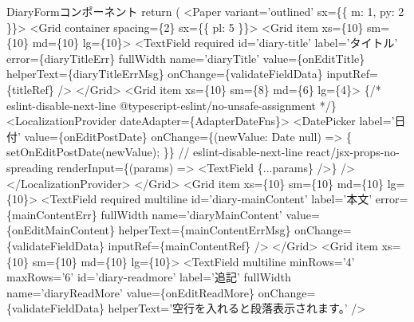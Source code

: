\begin{starterprogram}[]{DiaryFormコンポーネント}
{    return (
      \textless{}Paper variant='outlined' sx=\{\{ m: 1, py: 2 \}\}\textgreater{}
        \textless{}Grid container spacing=\{2\} sx=\{\{ pl: 5 \}\}\textgreater{}
          \textless{}Grid item xs=\{10\} sm=\{10\} md=\{10\} lg=\{10\}\textgreater{}
            \textless{}TextField
              required
              id='diary{-}title'
              label='タイトル'
              error=\{diaryTitleErr\}
              fullWidth
              name='diaryTitle'
              value=\{onEditTitle\}
              helperText=\{diaryTitleErrMsg\}
              onChange=\{validateFieldData\}
              inputRef=\{titleRef\}
            /\textgreater{}
          \textless{}/Grid\textgreater{}
          \textless{}Grid item xs=\{10\} sm=\{8\} md=\{6\} lg=\{4\}\textgreater{}
            \{/* eslint{-}disable{-}next{-}line @typescript{-}eslint/no{-}unsafe{-}assignment */\}
            \textless{}LocalizationProvider dateAdapter=\{AdapterDateFns\}\textgreater{}
              \textless{}DatePicker
                label='日付'
                value=\{onEditPostDate\}
                onChange=\{(newValue: Date \textbar{} null) =\textgreater{} \{
                  setOnEditPostDate(newValue);
                \}\}
                // eslint{-}disable{-}next{-}line react/jsx{-}props{-}no{-}spreading
                renderInput=\{(params) =\textgreater{} \textless{}TextField \{...params\} /\textgreater{}\}
              /\textgreater{}
            \textless{}/LocalizationProvider\textgreater{}
          \textless{}/Grid\textgreater{}
          \textless{}Grid item xs=\{10\} sm=\{10\} md=\{10\} lg=\{10\}\textgreater{}
            \textless{}TextField
              required
              multiline
              id='diary{-}mainContent'
              label='本文'
              error=\{mainContentErr\}
              fullWidth
              name='diaryMainContent'
              value=\{onEditMainContent\}
              helperText=\{mainContentErrMsg\}
              onChange=\{validateFieldData\}
              inputRef=\{mainContentRef\}
            /\textgreater{}
          \textless{}/Grid\textgreater{}
          \textless{}Grid item xs=\{10\} sm=\{10\} md=\{10\} lg=\{10\}\textgreater{}
            \textless{}TextField
              multiline
              minRows='4'
              maxRows='6'
              id='diary{-}readmore'
              label='追記'
              fullWidth
              name='diaryReadMore'
              value=\{onEditReadMore\}
              onChange=\{validateFieldData\}
              helperText='空行を入れると段落表示されます。'
            /\textgreater{}
}
\end{starterprogram}
